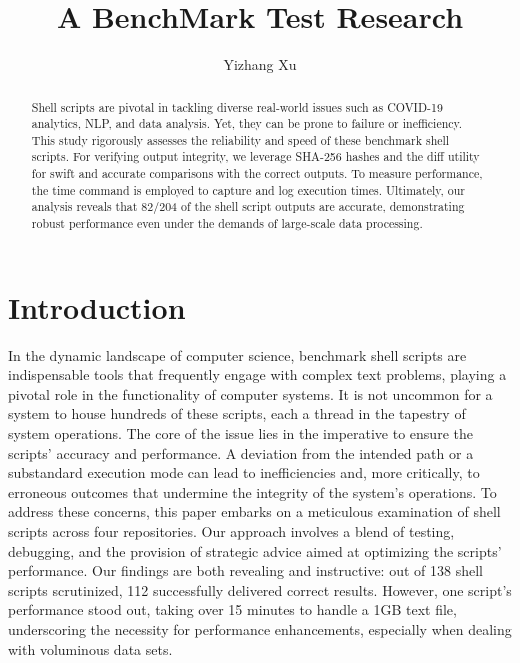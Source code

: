\documentclass[sigplan, screen, 10pt]{acmart}
\title{A BenchMark Test Research}
\author{Yizhang Xu}
\affiliation{BUPT}
\newcommand{\sys}{{\scshape pSys}\xspace}
\begin{document}
\begin{abstract}
Shell scripts are pivotal in tackling diverse real-world issues such as COVID-19 analytics, NLP, and data analysis. 
Yet, they can be prone to failure or inefficiency.
This study rigorously assesses the reliability and speed of these benchmark shell scripts.
For verifying output integrity, we leverage SHA-256 hashes and the diff utility for swift and accurate comparisons with the correct outputs.
To measure performance, the time command is employed to capture and log execution times.
Ultimately, our analysis reveals that 82/204 of the shell script outputs are accurate, demonstrating robust performance even under the demands of large-scale data processing.
\end{abstract}

\maketitle


\section{Introduction}
\label{intro}
In the dynamic landscape of computer science, benchmark shell scripts are indispensable tools that frequently engage with complex text problems, playing a pivotal role in the functionality of computer systems.
It is not uncommon for a system to house hundreds of these scripts, each a thread in the tapestry of system operations.\newline
The core of the issue lies in the imperative to ensure the scripts' accuracy and performance. 
A deviation from the intended path or a substandard execution mode can lead to inefficiencies and, more critically, to erroneous outcomes that undermine the integrity of the system's operations.\newline
To address these concerns, this paper embarks on a meticulous examination of shell scripts across four repositories. 
Our approach involves a blend of testing, debugging, and the provision of strategic advice aimed at optimizing the scripts' performance.\newline
Our findings are both revealing and instructive: out of 138 shell scripts scrutinized, 112 successfully delivered correct results. 
However, one script's performance stood out, taking over 15 minutes to handle a 1GB text file, underscoring the necessity for performance enhancements, especially when dealing with voluminous data sets.
\end{document}
